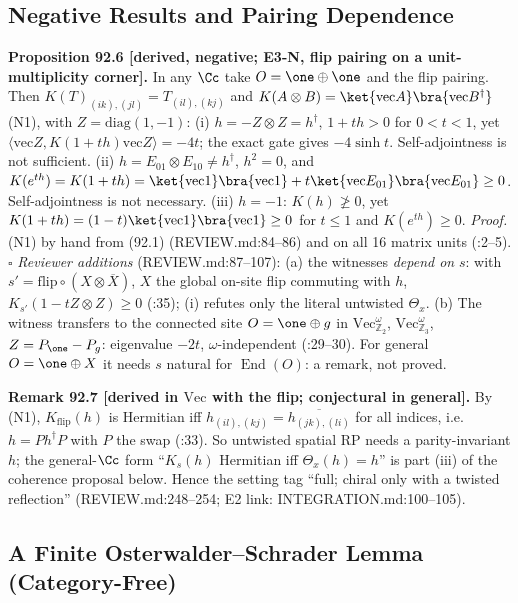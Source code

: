 \subsection{Negative Results and Pairing Dependence}

\textbf{Proposition 92.6 [derived, negative; E3-N, flip pairing on a unit-multiplicity corner].}  In any \(\Cc\) take
\(O=\one\oplus\one\) and the flip pairing.  Then \(K(T)_{(ik),(jl)}=T_{(il),(kj)}\) and \(K(A\otimes B)=\ket{\mathrm{vec}A}
\bra{\mathrm{vec}B^\dagger}\) (N1), with \(Z=\mathrm{diag}(1,-1)\):
(i) \(h=-Z\otimes Z=h^\dagger\), \(1+th>0\) for \(0<t<1\), yet \(\langle\mathrm{vec}Z,K(1+th)\mathrm{vec}Z\rangle=-4t\); the
exact gate gives \(-4\sinh t\).  Self-adjointness is not sufficient.
(ii) \(h=E_{01}\otimes E_{10}\neq h^\dagger\), \(h^2=0\), and \(K(e^{th})=K(1+th)=\ket{\mathrm{vec}1}\bra{\mathrm{vec}1}+t\ket{\mathrm{vec}
E_{01}}\bra{\mathrm{vec}E_{01}}\ge0\).  Self-adjointness is not necessary.
(iii) \(h=-1\): \(K(h)\not\ge0\), yet \(K(1+th)=(1-t)\ket{\mathrm{vec}1}\bra{\mathrm{vec}1}\ge0\) for \(t\le1\) and \(K(e^{th})\ge0\).
\emph{Proof.} (N1) by hand from (92.1) (REVIEW.md:84--86) and on all 16 matrix units (:2--5).
\(\square\)  \emph{Reviewer additions} (REVIEW.md:87--107): (a) the witnesses \emph{depend on} \(s\): with
\(s'=\mathrm{flip}\circ(X\otimes\overline X)\), \(X\) the global on-site flip commuting with \(h\),
\(K_{s'}(1-tZ\otimes Z)\ge0\) (:35); (i) refutes only the literal untwisted \(\Theta_x\).  (b) The
witness transfers to the connected site \(O=\one\oplus g\) in \(\mathrm{Vec}_{\mathbb Z_2}^\omega\),
\(\mathrm{Vec}_{\mathbb Z_3}^\omega\), \(Z=P_\one-P_g\): eigenvalue \(-2t\), \(\omega\)-independent (:29--30).
For general \(O=\one\oplus X\) it needs \(s\) natural for \(\operatorname{End}(O)\): a remark, not proved.

\textbf{Remark 92.7 [derived in \(\mathrm{Vec}\) with the flip; conjectural in general].}  By (N1), \(K_{\mathrm{flip}}(h)\) is
Hermitian iff \(h_{(il),(kj)}=\overline{h_{(jk),(li)}}\) for all indices, i.e.\ \(h=Ph^\dagger P\) with \(P\) the swap
(:33).  So untwisted spatial RP needs a parity-invariant \(h\); the general-\(\Cc\) form
``\(K_s(h)\) Hermitian iff \(\Theta_x(h)=h\)'' is part (iii) of the coherence proposal below.  Hence the setting tag
``full; chiral only with a twisted reflection'' (REVIEW.md:248--254; E2 link: INTEGRATION.md:100--105).

\subsection{A Finite Osterwalder--Schrader Lemma (Category-Free)}

